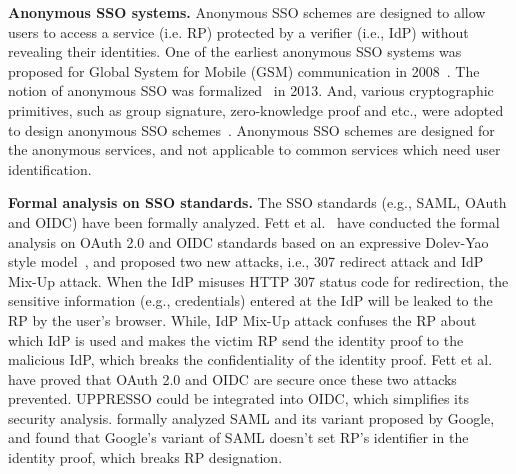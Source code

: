 \noindent\textbf{Anonymous SSO systems.}
Anonymous SSO schemes are designed to allow users to access a service (i.e. RP) protected by a verifier (i.e., IdP) without revealing their identities.
One of the earliest anonymous SSO systems was proposed for Global System for Mobile (GSM) communication in 2008~\cite{ElmuftiWRR08}.
The notion of anonymous SSO was formalized~\cite{WangWS13} in 2013.
And, various cryptographic primitives, such as group signature, zero-knowledge proof and etc., were adopted to design anonymous SSO schemes~\cite{WangWS13,HanCSTW18}.
Anonymous SSO schemes are designed for the anonymous services, and not applicable to common services which need user identification.



\noindent\textbf{Formal analysis on SSO standards.}
The SSO standards (e.g., SAML, OAuth and OIDC) have been formally analyzed.
Fett et al.~\cite{FettKS16, FettKS17} have conducted the formal analysis on OAuth 2.0 and OIDC standards based on an expressive Dolev-Yao style model~\cite{FettKS14},
and proposed two new attacks, i.e., 307 redirect attack and IdP Mix-Up attack.
When the IdP misuses HTTP 307 status code for redirection, the sensitive information (e.g., credentials) entered at the IdP will  be leaked to the RP by the user's browser.
While, IdP Mix-Up attack confuses the RP about which IdP is used and makes the victim RP send the identity proof to the malicious IdP, which breaks the confidentiality of the identity proof.
Fett et al.~\cite{FettKS16, FettKS17} have proved that OAuth 2.0 and OIDC are secure once these two attacks  prevented. UPPRESSO could be integrated into OIDC, which simplifies its security analysis.
\cite{ArmandoCCCT08} formally analyzed SAML and its variant proposed by Google, and found that Google's variant of SAML doesn't set RP's identifier in the identity proof, which breaks RP designation.

\begin{comment}
\noindent\textbf{Single sign-off.} In SSO systems, once a user's IdP account is compromised, the adversary could hijack all her RPs' accounts.
A backwards-compatible extension, named single sign-off, is proposed for OIDC.
The single sign-off  allows the user to revoke all her identity proofs and notify all RPs to freeze her accounts~\cite{GhasemisharifRC18}.
The single sign-off could also be achieved in UPPRESSO, where the user needs to revoke the identity proofs at all RPs, as the IdP doesn't know which RPs the user visits.
\end{comment}



